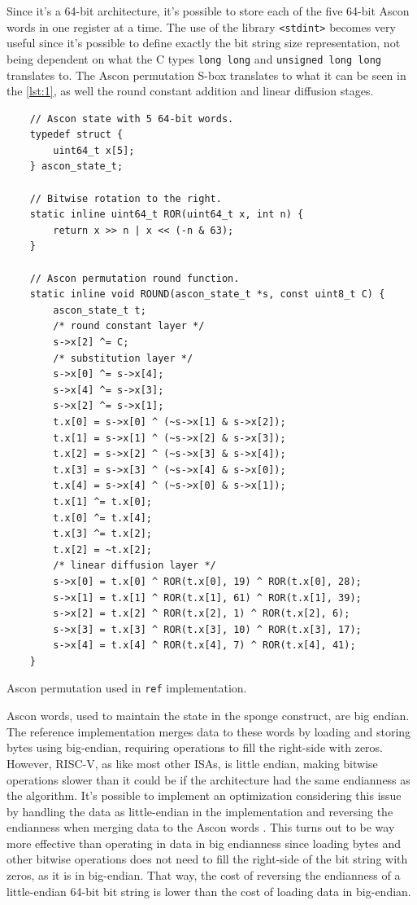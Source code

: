 \documentclass[11pt,twoside]{article}
\begin{document}
Since it's a 64-bit architecture, it's possible to store each of the five 64-bit Ascon words in one register at a time. The use of the library \texttt{<stdint>} becomes very useful since it's possible to define exactly the bit string size representation, not being dependent on what the C types \texttt{long long} and \texttt{unsigned long long} translates to. The Ascon permutation S-box translates to what it can be seen in the \cref{lst:1}, as well the round constant addition and linear diffusion stages.

\begin{listing}[ht!]
  \begin{verbatim}
    // Ascon state with 5 64-bit words.
    typedef struct {
        uint64_t x[5];
    } ascon_state_t;

    // Bitwise rotation to the right.
    static inline uint64_t ROR(uint64_t x, int n) {
        return x >> n | x << (-n & 63);
    }

    // Ascon permutation round function.
    static inline void ROUND(ascon_state_t *s, const uint8_t C) {
        ascon_state_t t;
        /* round constant layer */
        s->x[2] ^= C;
        /* substitution layer */
        s->x[0] ^= s->x[4];
        s->x[4] ^= s->x[3];
        s->x[2] ^= s->x[1];
        t.x[0] = s->x[0] ^ (~s->x[1] & s->x[2]);
        t.x[1] = s->x[1] ^ (~s->x[2] & s->x[3]);
        t.x[2] = s->x[2] ^ (~s->x[3] & s->x[4]);
        t.x[3] = s->x[3] ^ (~s->x[4] & s->x[0]);
        t.x[4] = s->x[4] ^ (~s->x[0] & s->x[1]);
        t.x[1] ^= t.x[0];
        t.x[0] ^= t.x[4];
        t.x[3] ^= t.x[2];
        t.x[2] = ~t.x[2];
        /* linear diffusion layer */
        s->x[0] = t.x[0] ^ ROR(t.x[0], 19) ^ ROR(t.x[0], 28);
        s->x[1] = t.x[1] ^ ROR(t.x[1], 61) ^ ROR(t.x[1], 39);
        s->x[2] = t.x[2] ^ ROR(t.x[2], 1) ^ ROR(t.x[2], 6);
        s->x[3] = t.x[3] ^ ROR(t.x[3], 10) ^ ROR(t.x[3], 17);
        s->x[4] = t.x[4] ^ ROR(t.x[4], 7) ^ ROR(t.x[4], 41);
    }
  \end{verbatim}
  \caption{Ascon permutation used in \texttt{ref} implementation.}
  \label{lst:1}
\end{listing}

Ascon words, used to maintain the state in the sponge construct, are big endian. The reference implementation merges data to these words by loading and storing bytes using big-endian, requiring operations to fill the right-side with zeros. However, RISC-V, as like most other ISAs, is little endian, making bitwise operations slower than it could be if the architecture had the same endianness as the algorithm. It's possible to implement an optimization considering this issue by handling the data as little-endian in the implementation and reversing the endianness when merging data to the Ascon words \cite{jellema2019optimizing}. This turns out to be way more effective than operating in data in big endianness since loading bytes and other bitwise operations does not need to fill the right-side of the bit string with zeros, as it is in big-endian. That way, the cost of reversing the endianness of a little-endian 64-bit bit string is lower than the cost of loading data in big-endian.
\end{document}
